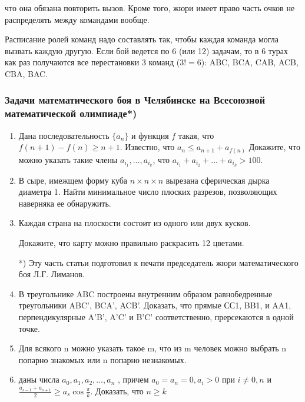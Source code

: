 \begin{multicols}{2}
\noindent что она обязана повторить вызов.
Кроме того, жюри имеет право часть очков не распределять между командами вообще.

Расписание ролей команд надо составлять так, чтобы каждая команда могла вызвать каждую другую. 
Если бой ведется по 6 (или 12) задачам, то в 6 турах как раз получаются все перестановки 3 команд ($3! = 6$):
ABC, BCA, CAB, ACB, CBA, BAC.


\begin{center}
\subsubsection*{Задачи математического боя в Челябинске на Всесоюзной математической олимпиаде*)} 
\end{center}




\begin{enumerate}

\item Дана последовательность $\{a_n\}$
и функция $f$
такая, что $f(n+1)-f(n)\geqslant n+1$.
Известно, что $a_n \leqslant a_{n+1} + a_{f(n)}$  
Докажите, что можно указать такие члены $a_{i_1}, ..., a_{i_k}  $, что $ a_{i_1} + a_{i_2} + ... + a_{i_k} > 100$.

\item В сыре, имежщем форму куба $ n  \times  n  \times  n$ вырезана сферическая дырка диаметра 1. Найти минимальное число плоских разрезов, позволяющих наверняка ее обнаружить.

\item Каждая страна на плоскости состоит из одного или двух кусков. 

Докажите, что карту можно правильно раскрасить 12 цветами.


*) Эту часть статьи подготовил к печати председатель жюри математического боя Л.Г. Лиманов.


\item В треугольнике ABC построены внутренним образом равнобедренные треугольники ABC', BCA', ACB'. Доказать, что прямые СС1, BB1, 
и AA1, перпендикулярные A'B', A'C' и B'C' соответственно, прерсекаются в одной точке.

\item Для всякого n можно указать такое m, что из m человек можно выбрать n попарно знакомых или n попарно незнакомых. 

\item даны числа $a_0, a_1, a_2, ..., a_n $ , причем $a_0 = a_n = 0, a_i > 0 $ при $i\neq 0,n $ и  $\frac{a_{s-1} + a_{s+1}}{2} \geqslant a_s \cos \frac{\pi}{k} $.
Доказать, что $n \geqslant k $


\end{enumerate}
\end{multicols}
